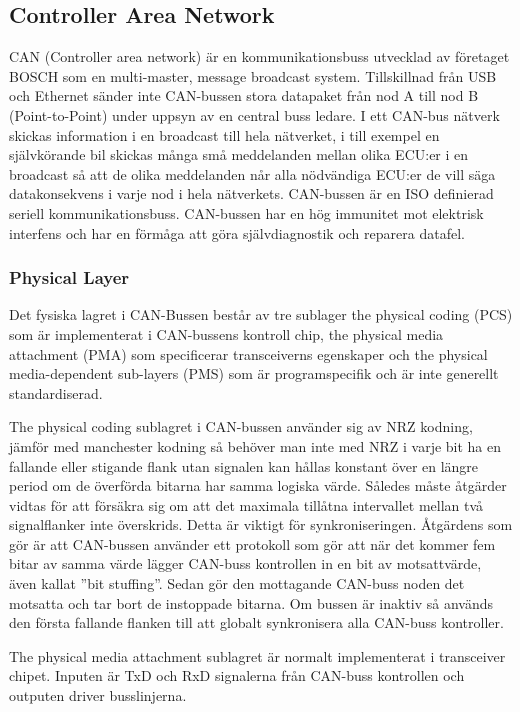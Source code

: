 \documentclass[a4paper]{IEEEtran}
\begin{document}
\subsection{Controller Area Network} \label{sec:CAN}
CAN (Controller area network) är en kommunikationsbuss utvecklad av företaget BOSCH som en multi-master, message broadcast system. Tillskillnad från USB och Ethernet sänder inte CAN-bussen stora datapaket från nod A till nod B (Point-to-Point) under uppsyn av en central buss ledare. I ett CAN-bus nätverk skickas information i en broadcast till hela nätverket, i till exempel en självkörande bil skickas många små meddelanden mellan olika ECU:er i en broadcast så att de olika meddelanden når alla nödvändiga ECU:er de vill säga datakonsekvens i varje nod i hela nätverkets. CAN-bussen är en ISO definierad seriell kommunikationsbuss. CAN-bussen har en hög immunitet mot elektrisk interfens och har en förmåga att göra självdiagnostik och reparera datafel. \cite{CANintr}

\subsubsection{Physical Layer}
Det fysiska lagret i CAN-Bussen består av tre sublager the physical coding (PCS) som är implementerat i CAN-bussens kontroll chip, the physical media attachment (PMA) som specificerar transceiverns egenskaper och the physical media-dependent sub-layers (PMS) som är programspecifik och är inte generellt standardiserad.

The physical coding sublagret i CAN-bussen använder sig av NRZ kodning, jämför med manchester kodning så behöver man inte med NRZ i varje bit ha en fallande eller stigande flank utan signalen kan hållas konstant över en längre period om de överförda bitarna har samma logiska värde. Således måste åtgärder vidtas för att försäkra sig om att det maximala tillåtna intervallet mellan två signalflanker inte överskrids. Detta är viktigt för synkroniseringen. Åtgärdens som gör är att CAN-bussen använder ett protokoll som gör att när det kommer fem bitar av samma värde lägger CAN-buss kontrollen in en bit av motsattvärde, även kallat ”bit stuffing”. Sedan gör den mottagande CAN-buss noden det motsatta och tar bort de instoppade bitarna.
Om bussen är inaktiv så används den första fallande flanken till att globalt synkronisera alla CAN-buss kontroller. 

The physical media attachment sublagret är normalt implementerat i transceiver chipet. Inputen är TxD och RxD signalerna från CAN-buss kontrollen och outputen driver busslinjerna. \cite{CANphys}
\end{document}
